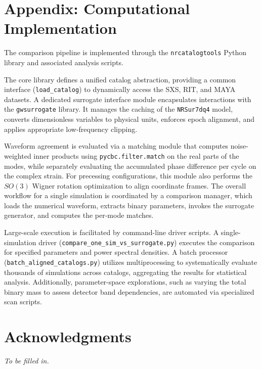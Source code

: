 \documentclass[%
 reprint,
superscriptaddress,
 amsmath,amssymb,
 aps,
]{revtex4-2}
\begin{document}
\section{Appendix: Computational Implementation}

The comparison pipeline is implemented through the \texttt{nrcatalogtools} Python library and associated analysis scripts. 

The core library defines a unified catalog abstraction, providing a common interface (\texttt{load\_catalog}) to dynamically access the SXS, RIT, and MAYA datasets. A dedicated surrogate interface module encapsulates interactions with the \texttt{gwsurrogate} library. It manages the caching of the \texttt{NRSur7dq4} model, converts dimensionless variables to physical units, enforces epoch alignment, and applies appropriate low-frequency clipping.

Waveform agreement is evaluated via a matching module that computes noise-weighted inner products using \texttt{pycbc.filter.match} on the real parts of the modes, while separately evaluating the accumulated phase difference per cycle on the complex strain. For precessing configurations, this module also performs the $SO(3)$ Wigner rotation optimization to align coordinate frames. The overall workflow for a single simulation is coordinated by a comparison manager, which loads the numerical waveform, extracts binary parameters, invokes the surrogate generator, and computes the per-mode matches.

Large-scale execution is facilitated by command-line driver scripts. A single-simulation driver (\texttt{compare\_one\_sim\_vs\_surrogate.py}) executes the comparison for specified parameters and power spectral densities. A batch processor (\texttt{batch\_aligned\_catalogs.py}) utilizes multiprocessing to systematically evaluate thousands of simulations across catalogs, aggregating the results for statistical analysis. Additionally, parameter-space explorations, such as varying the total binary mass to assess detector band dependencies, are automated via specialized scan scripts.


\section{Acknowledgments}

\textit{To be filled in.}



\end{document}
